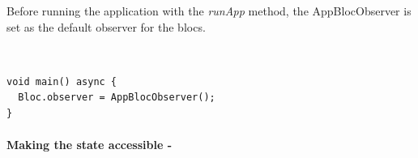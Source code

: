 Before running the application with the \textit{runApp} method, the AppBlocObserver is set as the default observer for the blocs.
\begin{code}
\mbox{}\\
 \mbox{}
\label{code:2.14}
\begin{verbatim}
void main() async {
  Bloc.observer = AppBlocObserver();
}
\end{verbatim}
\mbox{}
\end{code}
\paragraph{Making the state accessible - }
\label{subpar:todo_app_bloc_core_state}

